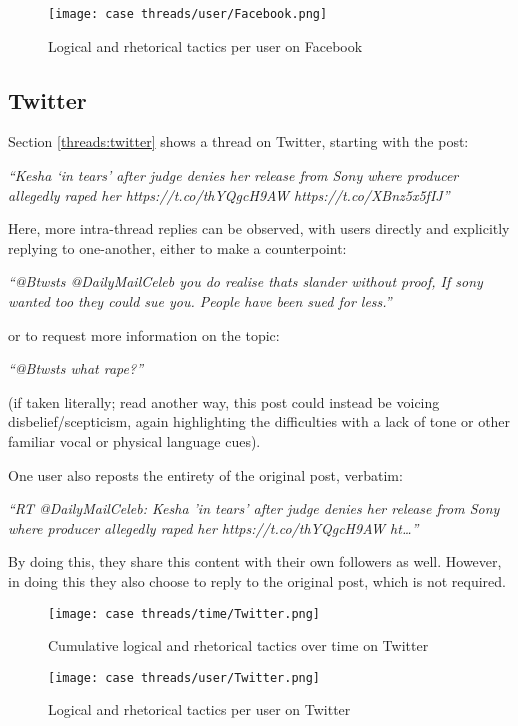 \begin{figure}
\centering
\texttt{[image: case threads/user/Facebook.png]}
\caption{Logical and rhetorical tactics per user on Facebook}
\label{casegraph:user:facebook}
\end{figure}


\subsection{Twitter}
Section \ref{threads:twitter} shows a thread on Twitter, starting with the post:

\textit{``Kesha `in tears' after judge denies her release from Sony where producer allegedly raped her https://t.co/thYQgcH9AW https://t.co/XBnz5x5fIJ''}

Here, more intra-thread replies can be observed, with users directly and explicitly replying to one-another, either to make a counterpoint:

\textit{``@Btwsts @DailyMailCeleb you do realise thats slander without proof, If sony wanted too they could sue you. People have been sued for less.''}

or to request more information on the topic:

\textit{``@Btwsts what rape?''}

(if taken literally; read another way, this post could instead be voicing disbelief/scepticism, again highlighting the difficulties with a lack of tone or other familiar vocal or physical language cues).

One user also reposts the entirety of the original post, verbatim:

\textit{``RT @DailyMailCeleb: Kesha 'in tears' after judge denies her release from Sony where producer allegedly raped her https://t.co/thYQgcH9AW ht…''}

By doing this, they share this content with their own followers as well. However, in doing this they also choose to reply to the original post, which is not required.


\begin{figure}
\centering
\texttt{[image: case threads/time/Twitter.png]}
\caption{Cumulative logical and rhetorical tactics over time on Twitter}
\label{casegraph:time:twitter}
\end{figure}

\begin{figure}
\centering
\texttt{[image: case threads/user/Twitter.png]}
\caption{Logical and rhetorical tactics per user on Twitter}
\label{casegraph:user:twitter}
\end{figure}


